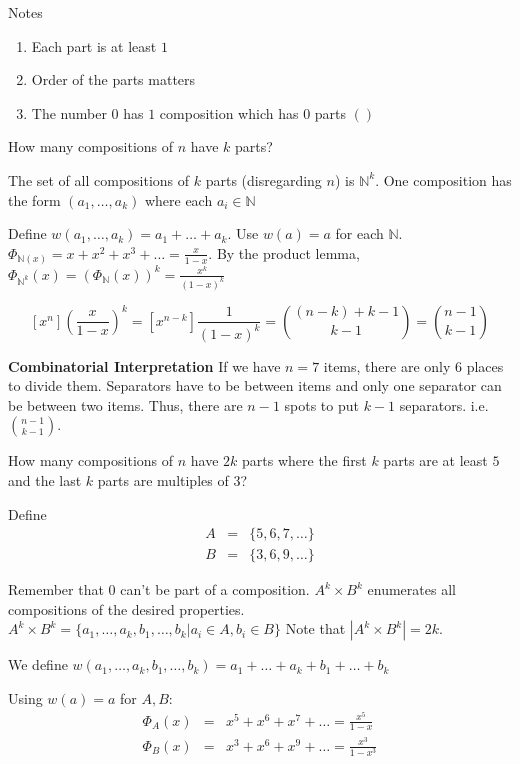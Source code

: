 \documentclass{article}
\newcommand{\todots}[2]{#1_1, \dots, #1_#2}
\newcommand{\sumdots}[2]{#1_1 + \dots + #1_#2}
\begin{document}
Notes
\begin{enumerate}
	\item Each part is at least $1$
	\item Order of the parts matters
	\item The number $0$ has $1$ composition which has $0$ parts $()$
\end{enumerate}

\example
How many compositions of $n$ have $k$ parts?

The set of all compositions of $k$ parts (disregarding $n$) is $\mathbb{N}^k$. One composition has the form $(a_1, \dots, a_k)$ where each $a_i \in \mathbb{N}$

Define $w(a_1, \dots , a_k) = a_1 + \dots + a_k$. Use $w(a) = a$ for each $\mathbb{N}$. $\Phi_{\mathbb{N}(x)} = x + x^2 + x^3 + \dots = \frac{x}{1-x}$. By the product lemma, $\Phi_{\mathbb{N}^k}(x) = \left( \Phi_{\mathbb{N}}(x) \right)^k = \frac{x^k}{(1-x)^k}$

$$[x^n] \left( \frac{x}{1-x} \right)^k = [x^{n-k}] \frac{1}{(1-x)^k} = \binom {(n-k) + k -1}{k-1} = \binom {n-1}{k-1}$$

\textbf{Combinatorial Interpretation}
If we have $n=7$ items, there are only $6$ places to divide them. Separators have to be between items and only one separator can be between two items. Thus, there are $n-1$ spots to put $k-1$ separators. i.e. $\binom {n-1}{k-1}$.

\example
How many compositions of $n$ have $2k$ parts where the first $k$ parts are at least $5$ and the last $k$ parts are multiples of $3$?

Define
\begin{eqnarray*}
	A &=& \{ 5,6,7, \dots\} \\
	B &=& \{3,6,9, \dots \}
\end{eqnarray*}

Remember that $0$ can't be part of a composition. $A^k \times B^k$ enumerates all compositions of the desired properties. $A^k \times B^k = \{\todots{a}{k},\todots{b}{k} | a_i \in A, b_i \in B\}$ Note that $|A^k \times B^k| = 2k$.

We define $w(\todots{a}{k}, \todots{b}{k}) = \sumdots{a}{k} + \sumdots{b}{k}$

Using $w(a) = a$ for $A,B$:
\begin{eqnarray*}
	\Phi_A(x) &=& x^5 + x^6 + x^7 + \dots = \frac{x^5}{1-x} \\
	\Phi_B(x) &=& x^3 + x^6 + x^9 + \dots = \frac{x^3}{1-x^3}
\end{eqnarray*}
\end{document}
